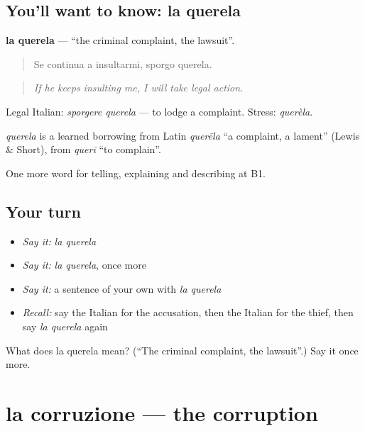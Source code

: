 \subsection*{You'll want to know: la querela}
\textbf{la querela} — \textquotedblleft{}the criminal complaint, the lawsuit\textquotedblright{}.

\begin{quote}
Se continua a insultarmi, sporgo querela.
\end{quote}

\begin{quote}
\emph{If he keeps insulting me, I will take legal action.}
\end{quote}

Legal Italian: \emph{sporgere querela} — to lodge a complaint. Stress: \emph{querèla}.

\begin{cousinweb}
\emph{querela} is a learned borrowing from Latin \emph{querēla} \textquotedblleft{}a complaint, a lament\textquotedblright{} (Lewis \& Short), from \emph{querī} \textquotedblleft{}to complain\textquotedblright{}.
\end{cousinweb}

\begin{grammarlens}[title={What you've built}]
One more word for telling, explaining and describing at B1.
\end{grammarlens}

\subsection*{Your turn}
\begin{itemize}
\raggedright
  \item \emph{Say it:} \emph{la querela}
  \item \emph{Say it:} \emph{la querela}, once more
  \item \emph{Say it:} a sentence of your own with \emph{la querela}
  \item \emph{Recall:} say the Italian for the accusation, then the Italian for the thief, then say \emph{la querela} again
\end{itemize}

\begin{tcolorbox}[breakable,colback=teal!4,colframe=teal!35!black,title={Before you move on}]
What does la querela mean? (\textquotedblleft{}The criminal complaint, the lawsuit\textquotedblright{}.) Say it once more.
\end{tcolorbox}
\section[la corruzione]{la corruzione — the corruption}

